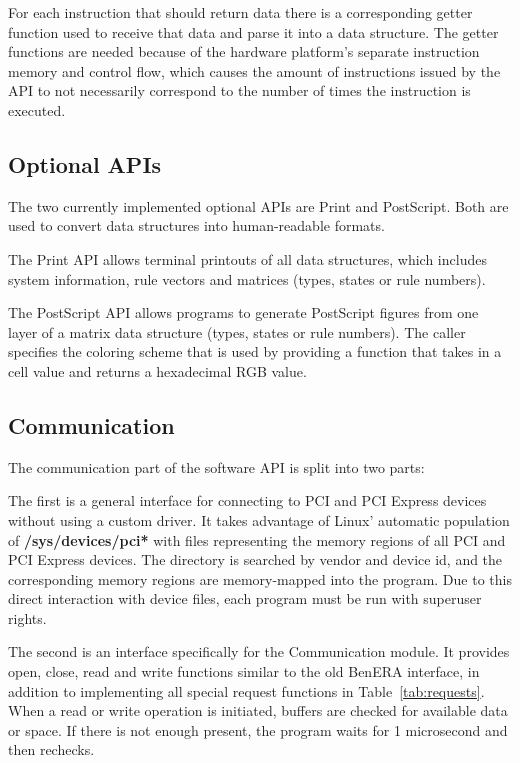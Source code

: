 For each instruction that should return data there is a corresponding getter function used to receive that data and parse it into a data structure.
The getter functions are needed because of the hardware platform's separate instruction memory and control flow, which causes the amount of instructions issued by the API to not necessarily correspond to the number of times the instruction is executed.

\subsection{Optional APIs}

The two currently implemented optional APIs are Print and PostScript.
Both are used to convert data structures into human-readable formats.

The Print API allows terminal printouts of all data structures, which includes system information, rule vectors and matrices (types, states or rule numbers).

The PostScript API allows programs to generate PostScript figures from one layer of a matrix data structure (types, states or rule numbers).
The caller specifies the coloring scheme that is used by providing a function that takes in a cell value and returns a hexadecimal RGB value.

\subsection{Communication}

The communication part of the software API is split into two parts:

The first is a general interface for connecting to PCI and PCI Express devices without using a custom driver.
It takes advantage of Linux' automatic population of \textbf{/sys/devices/pci*} with files representing the memory regions of all PCI and PCI Express devices.
The directory is searched by vendor and device id, and the corresponding memory regions are memory-mapped into the program.
Due to this direct interaction with device files, each program must be run with superuser rights.

The second is an interface specifically for the Communication module.
It provides open, close, read and write functions similar to the old BenERA interface, in addition to implementing all special request functions in Table~\ref{tab:requests}.
When a read or write operation is initiated, buffers are checked for available data or space.
If there is not enough present, the program waits for 1 microsecond and then rechecks.

